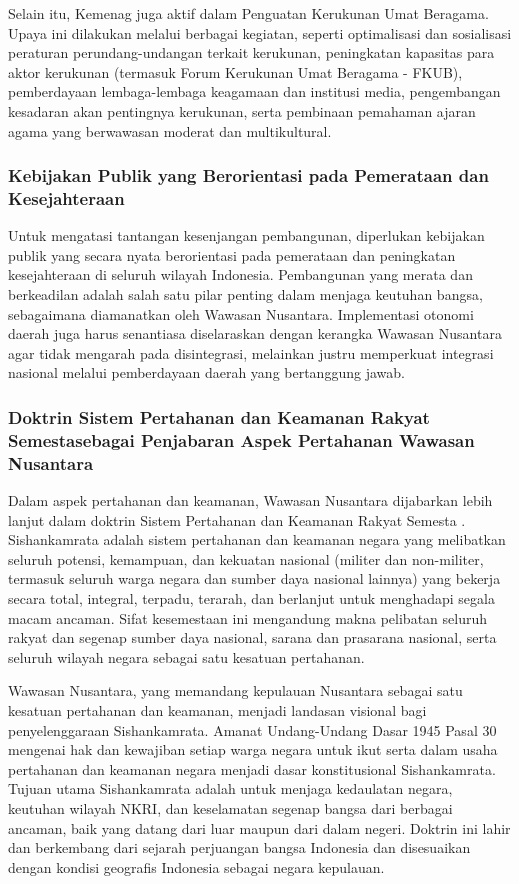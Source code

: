 \documentclass[12pt, a4paper]{article}
\begin{document}
Selain itu, Kemenag juga aktif dalam Penguatan Kerukunan Umat Beragama. Upaya ini dilakukan melalui berbagai kegiatan, seperti optimalisasi dan sosialisasi peraturan perundang-undangan terkait kerukunan, peningkatan kapasitas para aktor kerukunan (termasuk Forum Kerukunan Umat Beragama - FKUB), pemberdayaan lembaga-lembaga keagamaan dan institusi media, pengembangan kesadaran akan pentingnya kerukunan, serta pembinaan pemahaman ajaran agama yang berwawasan moderat dan multikultural.  

\subsubsection*{Kebijakan Publik yang Berorientasi pada Pemerataan dan Kesejahteraan}

Untuk mengatasi tantangan kesenjangan pembangunan, diperlukan kebijakan publik yang secara nyata berorientasi pada pemerataan dan peningkatan kesejahteraan di seluruh wilayah Indonesia. Pembangunan yang merata dan berkeadilan adalah salah satu pilar penting dalam menjaga keutuhan bangsa, sebagaimana diamanatkan oleh Wawasan Nusantara. Implementasi otonomi daerah juga harus senantiasa diselaraskan dengan kerangka Wawasan Nusantara agar tidak mengarah pada disintegrasi, melainkan justru memperkuat integrasi nasional melalui pemberdayaan daerah yang bertanggung jawab.  

\subsubsection*{Doktrin Sistem Pertahanan dan Keamanan Rakyat Semestasebagai Penjabaran Aspek Pertahanan Wawasan Nusantara}

Dalam aspek pertahanan dan keamanan, Wawasan Nusantara dijabarkan lebih lanjut dalam doktrin Sistem Pertahanan dan Keamanan Rakyat Semesta \cite{SISHANKAMRATA}. Sishankamrata adalah sistem pertahanan dan keamanan negara yang melibatkan seluruh potensi, kemampuan, dan kekuatan nasional (militer dan non-militer, termasuk seluruh warga negara dan sumber daya nasional lainnya) yang bekerja secara total, integral, terpadu, terarah, dan berlanjut untuk menghadapi segala macam ancaman. Sifat kesemestaan ini mengandung makna pelibatan seluruh rakyat dan segenap sumber daya nasional, sarana dan prasarana nasional, serta seluruh wilayah negara sebagai satu kesatuan pertahanan.  

Wawasan Nusantara, yang memandang kepulauan Nusantara sebagai satu kesatuan pertahanan dan keamanan, menjadi landasan visional bagi penyelenggaraan Sishankamrata. Amanat Undang-Undang Dasar 1945 Pasal 30 mengenai hak dan kewajiban setiap warga negara untuk ikut serta dalam usaha pertahanan dan keamanan negara menjadi dasar konstitusional Sishankamrata. Tujuan utama Sishankamrata adalah untuk menjaga kedaulatan negara, keutuhan wilayah NKRI, dan keselamatan segenap bangsa dari berbagai ancaman, baik yang datang dari luar maupun dari dalam negeri. Doktrin ini lahir dan berkembang dari sejarah perjuangan bangsa Indonesia dan disesuaikan dengan kondisi geografis Indonesia sebagai negara kepulauan.  
\end{document}
